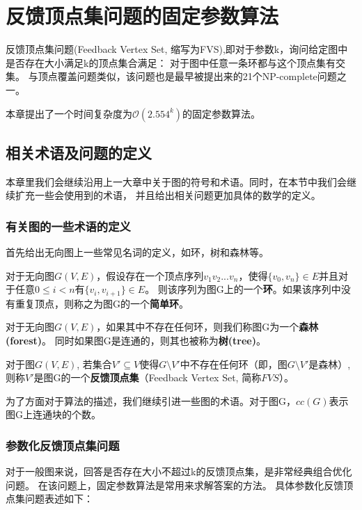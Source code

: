 \chapter{反馈顶点集问题的固定参数算法}
反馈顶点集问题(Feedback Vertex Set, 缩写为FVS),即对于参数k，询问给定图中是否存在大小满足k的顶点集合满足：
对于图中任意一条环都与这个顶点集有交集。
与顶点覆盖问题类似，该问题也是最早被提出来的21个NP-complete问题之一\cite{karp1972reducibility}。

本章提出了一个时间复杂度为$\mathcal{O}(2.554^k)$的固定参数算法。
\section{相关术语及问题的定义}

本章里我们会继续沿用上一大章中关于图的符号和术语。同时，在本节中我们会继续扩充一些会使用到的术语，
并且给出相关问题更加具体的数学的定义。
\subsection{有关图的一些术语的定义}
首先给出无向图上一些常见名词的定义，如环，树和森林等。
\begin{definition}[环]
对于无向图$G(V,E)$，假设存在一个顶点序列$v_1v_2...v_n$，使得$\{v_0, v_n\} \in E$并且对于任意$0 \le i < n$有$\{v_i, v_{i+1}\} \in E$。
则该序列为图G上的一个\textbf{环}。如果该序列中没有重复顶点，则称之为图G的一个\textbf{简单环}。
\end{definition}

\begin{definition}
对于无向图$G(V,E)$，如果其中不存在任何环，则我们称图G为一个\textbf{森林(forest)}。
同时如果图G是连通的，则其也被称为\textbf{树(tree)}。
\end{definition}

\begin{definition}[反馈顶点集]
对于图$G(V, E)$, 若集合$V' \subseteq V$使得$G \setminus V'$中不存在任何环（即，图$G \setminus V'$是森林）,
则称$V'$是图G的一个\textbf{反馈顶点集}（Feedback Vertex Set, 简称$FVS$）。
\end{definition}

为了方面对于算法的描述，我们继续引进一些图的术语。对于图G，$cc(G)$表示图G上连通块的个数。

\subsection{参数化反馈顶点集问题}
对于一般图来说，回答是否存在大小不超过k的反馈顶点集，是非常经典组合优化问题。
在该问题上，固定参数算法是常用来求解答案的方法。
具体参数化反馈顶点集问题表述如下：\\

